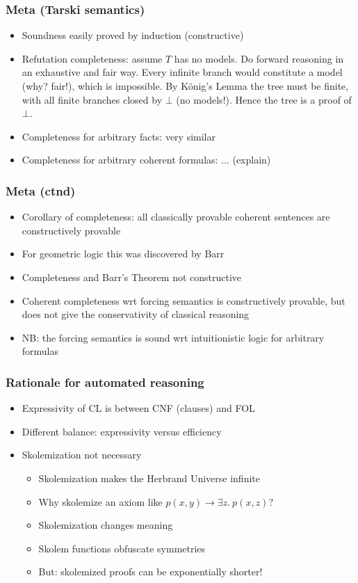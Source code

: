 \documentclass[handout,11pt]{beamer}
\begin{document}
\begin{frame}
\frametitle{Meta (Tarski semantics)}
 \begin{itemize}[<+->]   %
    \item Soundness easily proved by induction (constructive)
    \item Refutation completeness: assume $T$ has no models. Do forward reasoning in
an exhaustive and fair way. Every infinite branch would constitute
a model (why? fair!), which is impossible. By K\"onig's Lemma the tree must be finite,
with all finite branches closed by $\bot$ (no models!). Hence the tree is a proof of 
$\bot$.  
    \item Completeness for arbitrary facts: very similar
    \item Completeness for arbitrary coherent formulas: ... (explain)
 \end{itemize}
\end{frame}

\begin{frame}
\frametitle{Meta (ctnd)}
 \begin{itemize}[<+->]   %
    \item Corollary of completeness: 
    all classically provable coherent sentences are constructively provable
    \item For \alert{geometric} logic this was discovered by Barr
    \item Completeness and Barr's Theorem \alert{not constructive}
    \item Coherent completeness wrt forcing semantics is constructively
         provable, but does not give the conservativity of classical reasoning
    \item NB: the forcing semantics is sound wrt intuitionistic logic for arbitrary formulas
 \end{itemize}
\end{frame}


\begin{frame}
\frametitle{Rationale for automated reasoning}
 \begin{itemize}[<+->] %
    \item Expressivity of CL is between CNF (clauses) and FOL
    \item Different balance: expressivity versus efficiency
    \item Skolemization not necessary
    \begin{itemize}
       \item Skolemization makes the Herbrand Universe infinite
       \item Why skolemize an axiom like $p(x,y)\to\exists z.~p(x,z)$?
       \item Skolemization changes meaning
       \item Skolem functions obfuscate symmetries
       \item \alert{But: skolemized proofs can be exponentially shorter!}
    \end{itemize}
 \end{itemize}
\end{frame}
\end{document}
